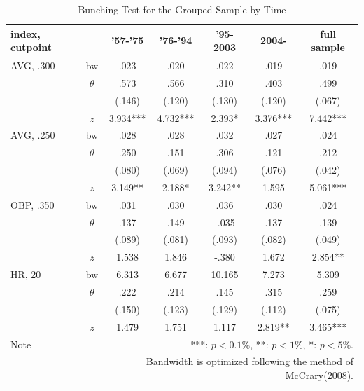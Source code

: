 \documentclass[dvipdfmx,12pt]{beamer}
\begin{document}
\begin{frame}
  \begin{table}
    \centering
    \caption{Bunching Test for the Grouped Sample by Time}
    \label{Mani-Era}
    \tiny
    \begin{tabular}{lcccccc} \hline
      index, cutpoint &  & '57-'75 &'76-'94 & '95-2003 & 2004- &full sample \\ \hline \hline
      AVG, .300 & bw & .023 & .020 & .022 & .019 & .019 \\
      & $\theta$ & .573 & .566 & .310 & .403 & .499 \\
      & & (.146) & (.120) & (.130) & (.120) & (.067) \\
      & $z$ & 3.934*** & 4.732*** & 2.393* & 3.376*** & 7.442*** \\ \hline
      AVG, .250 & bw & .028 & .028 & .032 & .027 & .024 \\
      & $\theta$ & .250 & .151 & .306 & .121 & .212 \\
      & & (.080) & (.069) & (.094)& (.076) & (.042) \\
      & $z$ & 3.149** & 2.188* & 3.242** & 1.595 & 5.061*** \\ \hline
      OBP, .350 & bw & .031 & .030 & .036 & .030 & .024 \\
      & $\theta$ & .137 & .149 & -.035 & .137 & .139 \\
      & & (.089) & (.081) & (.093) & (.082) & (.049) \\
      & $z$ & 1.538 & 1.846 & -.380 & 1.672 & 2.854** \\ \hline
      HR, 20 & bw & 6.313 & 6.677 & 10.165 & 7.273 & 5.309 \\
      & $\theta$ & .222 & .214 & .145 & .315 & .259 \\
      & & (.150) & (.123) & (.129) & (.112) & (.075) \\
      & $z$ & 1.479 & 1.751 & 1.117 & 2.819** & 3.465*** \\ \hline
      Note & \multicolumn{6}{r}{
      ***: $p<0.1\%$, **: $p<1\%$, *: $p<5\%$.
      }\\
      & \multicolumn{6}{r}{
      Bandwidth is optimized following the method of McCrary(2008).
      }
    \end{tabular}
  \end{table}
\end{frame}
\end{document}
